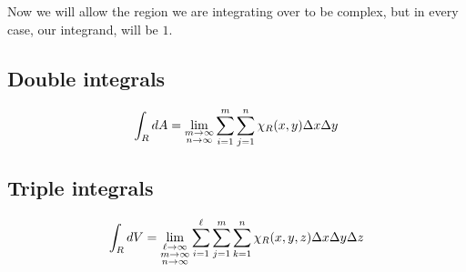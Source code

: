 \documentclass{ximera}
\begin{document}
Now we will allow the region we are integrating over to be complex,
but in every case, our integrand, will be $1$.

\subsection{Double integrals}


\[
\int_R \mathop{}\!d A = \lim_{\substack{m\to\infty\\ n\to\infty}}\sum_{i=1}^m\sum_{j=1}^n \chi_{R}(x,y)\Delta x \Delta y
\]

\subsection{Triple integrals}

\[
\int_R \mathop{}\!d V = \lim_{\substack{\ell\to\infty\\ m\to\infty\\ n\to\infty}}\sum_{i=1}^\ell\sum_{j=1}^m \sum_{k=1}^n\chi_{R}(x,y,z)\Delta x\Delta y \Delta z
\]
\end{document}

